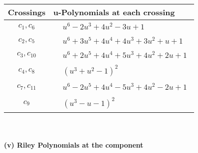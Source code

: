 \documentclass[1p]{elsarticle_modified}
\theoremstyle{definition}
\begin{document}
\begin{tabular}{m{50pt}|m{274pt}}
Crossings & \hspace{64pt}u-Polynomials at each crossing \\
\hline $$\begin{aligned}c_{1},c_{6}\end{aligned}$$&$\begin{aligned}
&u^6-2 u^3+4 u^2-3 u+1
\end{aligned}$\\
\hline $$\begin{aligned}c_{2},c_{5}\end{aligned}$$&$\begin{aligned}
&u^6+3 u^5+4 u^4+4 u^3+3 u^2+u+1
\end{aligned}$\\
\hline $$\begin{aligned}c_{3},c_{10}\end{aligned}$$&$\begin{aligned}
&u^6+2 u^5+4 u^4+5 u^3+4 u^2+2 u+1
\end{aligned}$\\
\hline $$\begin{aligned}c_{4},c_{8}\end{aligned}$$&$\begin{aligned}
&(u^3+u^2-1)^2
\end{aligned}$\\
\hline $$\begin{aligned}c_{7},c_{11}\end{aligned}$$&$\begin{aligned}
&u^6-2 u^5+4 u^4-5 u^3+4 u^2-2 u+1
\end{aligned}$\\
\hline $$\begin{aligned}c_{9}\end{aligned}$$&$\begin{aligned}
&(u^3- u-1)^2
\end{aligned}$\\
\hline
\end{tabular}\\~\\
\newpage\renewcommand{\arraystretch}{1}
\flushleft \textbf{(v) Riley Polynomials at the component}\newline \\
\end{document}
